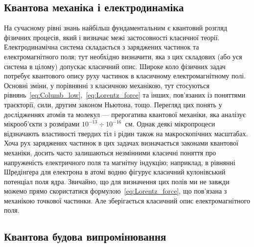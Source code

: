\subsection*{Квантова механіка і електродинаміка}


На сучасному рівні знань найбільш фундаментальним є квантовий розгляд фізичних процесів, який і визначає межі застосовності класичної теорії.
Електродинамічна система складається з заряджених частинок та електромагнітного поля; тут необхідно визначити, яка з цих складових (або уся система в
цілому) допускає класичний опис. Широке коло фізичних задач потребує квантового опису руху частинок в класичному електромагнітному полі. Основні зміни,
у порівнянні з класичною механікою, тут стосуються рівнянь~\eqref{eq:Columb_low},~\eqref{eq:Lorentz_force} та інших, пов’язаних із поняттями траєкторії,
сили, другим законом Ньютона, тощо. Перегляд цих понять у дослідженнях атомів та молекул --- прерогатива квантової механіки, яка аналізує мікрооб’єкти з
розмірами $10^{-13} \div 10^{-16}$~см. Однак деякі мікропроцеси відзначають властивості твердих тіл і рідин також на макроскопічних масштабах. Хоча рух
заряджених частинок в цих задачах визначається законами квантової механіки, досить часто залишаються незмінними класичні поняття про напруженість
електричного поля та магнітну індукцію; наприклад, в рівнянні Шредінгера для електрона в атомі водню фігурує класичний кулонівський потенціал поля ядра.
Звичайно, що для визначення цих полів ми не завжди можемо прямо скористатися формулою~\eqref{eq:Lorentz_force}, що пов’язана з механікою точкової
частинки. Але зберігається класичний опис електромагнітного поля.


\subsection*{Квантова будова випромінювання}

